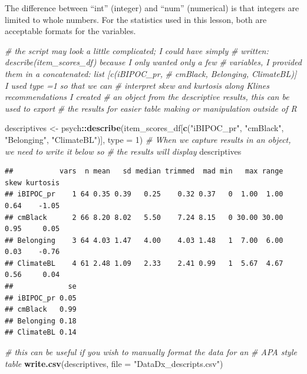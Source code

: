 \documentclass[
  11pt,
]{book}
\newenvironment{Shaded}{\begin{snugshade}}{\end{snugshade}}
\newcommand{\AttributeTok}[1]{\textcolor[rgb]{0.27,0.27,0.27}{#1}}
\newcommand{\CommentTok}[1]{\textcolor[rgb]{0.37,0.37,0.37}{\textit{#1}}}
\newcommand{\DecValTok}[1]{\textcolor[rgb]{0.06,0.06,0.06}{#1}}
\newcommand{\FunctionTok}[1]{\textcolor[rgb]{0.27,0.27,0.27}{\textbf{#1}}}
\newcommand{\NormalTok}[1]{#1}
\newcommand{\OtherTok}[1]{\textcolor[rgb]{0.37,0.37,0.37}{#1}}
\newcommand{\SpecialCharTok}[1]{\textcolor[rgb]{0.43,0.43,0.43}{\textbf{#1}}}
\newcommand{\StringTok}[1]{\textcolor[rgb]{0.5,0.5,0.5}{#1}}
\begin{document}
The difference between ``int'' (integer) and ``num'' (numerical) is that integers are limited to whole numbers. For the statistics used in this lesson, both are acceptable formats for the variables.

\begin{Shaded}
\begin{Highlighting}[]
\CommentTok{\# the script may look a little complicated; I could have simply}
\CommentTok{\# written: describe(item\_scores\_df) because I only wanted only a few}
\CommentTok{\# variables, I provided them in a concatenated: list [c(\textquotesingle{}iBIPOC\_pr\textquotesingle{},}
\CommentTok{\# \textquotesingle{}cmBlack\textquotesingle{}, \textquotesingle{}Belonging\textquotesingle{}, \textquotesingle{}ClimateBL\textquotesingle{})] I used type =1 so that we can}
\CommentTok{\# interpret skew and kurtosis along Kline\textquotesingle{}s recommendations I created}
\CommentTok{\# an object from the descriptive results, this can be used to export}
\CommentTok{\# the results for easier table making or manipulation outside of R}

\NormalTok{descriptives }\OtherTok{\textless{}{-}}\NormalTok{ psych}\SpecialCharTok{::}\FunctionTok{describe}\NormalTok{(item\_scores\_df[}\FunctionTok{c}\NormalTok{(}\StringTok{"iBIPOC\_pr"}\NormalTok{, }\StringTok{"cmBlack"}\NormalTok{,}
    \StringTok{"Belonging"}\NormalTok{, }\StringTok{"ClimateBL"}\NormalTok{)], }\AttributeTok{type =} \DecValTok{1}\NormalTok{)}
\CommentTok{\# When we capture results in an object, we need to write it below so}
\CommentTok{\# the results will display}
\NormalTok{descriptives}
\end{Highlighting}
\end{Shaded}

\begin{verbatim}
##           vars  n mean   sd median trimmed  mad min   max range skew kurtosis
## iBIPOC_pr    1 64 0.35 0.39   0.25    0.32 0.37   0  1.00  1.00 0.64    -1.05
## cmBlack      2 66 8.20 8.02   5.50    7.24 8.15   0 30.00 30.00 0.95     0.05
## Belonging    3 64 4.03 1.47   4.00    4.03 1.48   1  7.00  6.00 0.03    -0.76
## ClimateBL    4 61 2.48 1.09   2.33    2.41 0.99   1  5.67  4.67 0.56     0.04
##             se
## iBIPOC_pr 0.05
## cmBlack   0.99
## Belonging 0.18
## ClimateBL 0.14
\end{verbatim}

\begin{Shaded}
\begin{Highlighting}[]
\CommentTok{\# this can be useful if you wish to manually format the data for an}
\CommentTok{\# APA style table}
\FunctionTok{write.csv}\NormalTok{(descriptives, }\AttributeTok{file =} \StringTok{"DataDx\_descripts.csv"}\NormalTok{)}
\end{Highlighting}
\end{Shaded}
\end{document}

